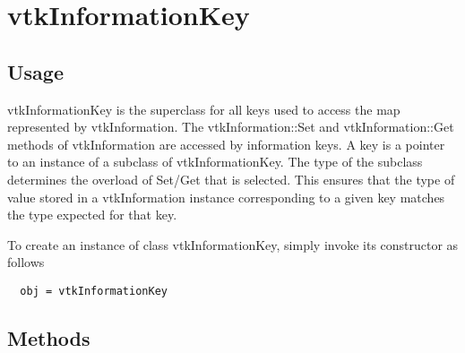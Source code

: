 \section{vtkInformationKey}

\subsection{Usage}

 vtkInformationKey is the superclass for all keys used to access the
 map represented by vtkInformation.  The vtkInformation::Set and
 vtkInformation::Get methods of vtkInformation are accessed by
 information keys.  A key is a pointer to an instance of a subclass
 of vtkInformationKey.  The type of the subclass determines the
 overload of Set/Get that is selected.  This ensures that the type
 of value stored in a vtkInformation instance corresponding to a
 given key matches the type expected for that key.

To create an instance of class vtkInformationKey, simply
invoke its constructor as follows
\begin{verbatim}
  obj = vtkInformationKey
\end{verbatim}
\subsection{Methods}

